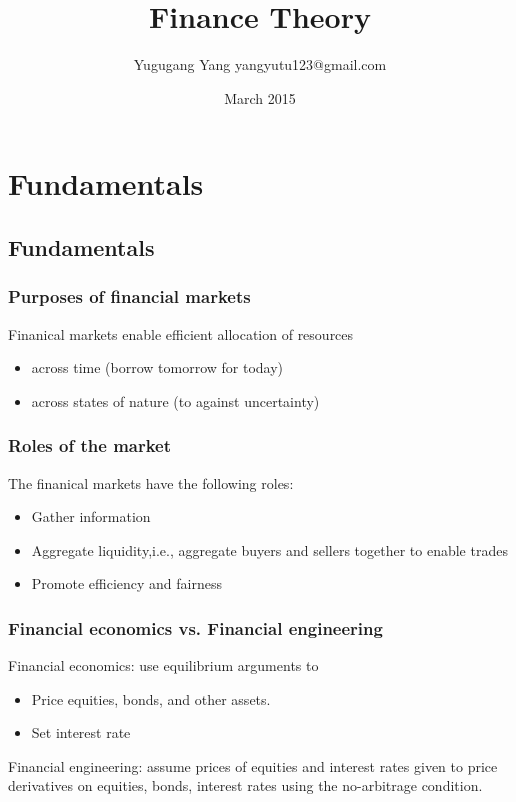 \documentclass[a4paper,13pt]{report}
\title{Finance Theory}
\author{Yugugang Yang yangyutu123@gmail.com }
\date{March 2015}
\begin{document}
\maketitle
\tableofcontents
\part{Fundamentals}
\chapter{Fundamentals}
\section{Purposes of financial markets}
Finanical markets enable efficient allocation of resources 
\begin{itemize}
    \item across time (borrow tomorrow for today)
    \item across states of nature (to against uncertainty)
\end{itemize}

\section{Roles of the market}
The finanical markets have the following roles:
\begin{itemize}
    \item Gather information
    \item Aggregate liquidity,i.e., aggregate buyers and sellers together to enable trades
    \item Promote efficiency and fairness
\end{itemize}

\section{Financial economics vs. Financial engineering }
Financial economics: use equilibrium arguments to 
\begin{itemize}
    \item Price equities, bonds, and other assets.
    \item Set interest rate
\end{itemize}

Financial engineering: assume prices of equities and interest rates given to price derivatives on equities, bonds, interest rates using the no-arbitrage condition.
\end{document}
